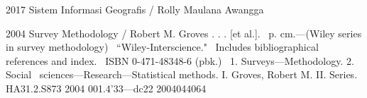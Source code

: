 \documentclass{WileySix}
\begin{document}

\subtitle{Mengenal dan Membangun SIG}

\author{Rolly Maulana Awangga}


\halftitlepage
\titlepage







\begin{copyrightpage}{2017}
Sistem Informasi Geografis / Rolly Maulana Awangga
\end{copyrightpage}

% 
 \begin{copyrightpage}{2004}
 Survey Methodology / Robert M. Groves . . . [et al.].
 \       p. cm.---(Wiley series in survey methodology)
 \    ``Wiley-Interscience."
 \    Includes bibliographical references and index.
 \    ISBN 0-471-48348-6 (pbk.)
 \    1. Surveys---Methodology.  2. Social 
 \  sciences---Research---Statistical methods.  I. Groves, Robert M.  II. %
 Series.\\

 HA31.2.S873 2004
 001.4'33---dc22                                             2004044064
 \end{copyrightpage}
\end{document}
